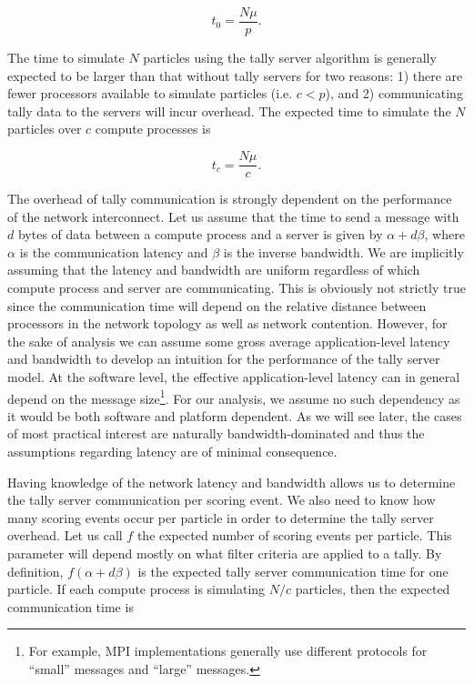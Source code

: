 \documentclass[3p]{elsarticle}
\begin{document}
\begin{equation}
  \label{eq:time-without}
  t_0 = \frac{N\mu}{p}.
\end{equation}

The time to simulate $N$ particles using the tally server algorithm is generally
expected to be larger than that without tally servers for two reasons: 1) there
are fewer processors available to simulate particles (i.e. $c < p$), and 2)
communicating tally data to the servers will incur overhead. The expected time
to simulate the $N$ particles over $c$ compute processes is

\begin{equation}
  \label{eq:compute-time}
  t_c = \frac{N\mu}{c}.
\end{equation}

\noindent The overhead of tally communication is strongly dependent on the
performance of the network interconnect. Let us assume that the time to send a
message with $d$ bytes of data between a compute process and a server is given
by $\alpha + d\beta$, where $\alpha$ is the communication latency and $\beta$ is
the inverse bandwidth. We are implicitly assuming that the latency and bandwidth
are uniform regardless of which compute process and server are
communicating. This is obviously not strictly true since the communication time
will depend on the relative distance between processors in the network topology
as well as network contention. However, for the sake of analysis we can assume
some gross average application-level latency and bandwidth to develop an
intuition for the performance of the tally server model. At the software level,
the effective application-level latency can in general depend on the message
size\footnote{For example, MPI implementations generally use different protocols
  for ``small'' messages and ``large'' messages.}. For our analysis, we assume
no such dependency as it would be both software and platform dependent. As we
will see later, the cases of most practical interest are naturally
bandwidth-dominated and thus the assumptions regarding latency are of minimal
consequence.

Having knowledge of the network latency and bandwidth allows us to determine the
tally server communication per scoring event.  We also need to know how many
scoring events occur per particle in order to determine the tally server
overhead. Let us call $f$ the expected number of scoring events per
particle. This parameter will depend mostly on what filter criteria are applied
to a tally. By definition, $f(\alpha + d\beta)$ is the expected tally server
communication time for one particle. If each compute process is simulating $N/c$
particles, then the expected communication time is
\end{document}
